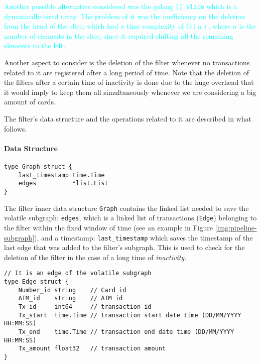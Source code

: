 \textcolor{cyan}{Another possible alternative considered was the golang \texttt{[] slice} which is a dynamically-sized array. The problem of it was the inefficiency on the deletion from the head of the slice, which had a time complexity of 
$O(n)$, where $n$ is the number of elements in the slice, since it required shifting all the remaining elements to the left.}

Another aspect to consider is the deletion of the filter whenever no transactions related to it are registered after a long period of time. Note that the deletion of the filters after a certain time of inactivity is done due to the huge overhead that it would imply to keep them all simultaneously whenever we are considering a big amount of cards.

The filter's data structure and the operations related to it are described in what follows.

\paragraph{Data Structure}

\begin{center}
\lstset{style=golangStyle}
\begin{lstlisting}[caption={filter subgraph data structure}]
type Graph struct {
	last_timestamp time.Time
	edges          *list.List
}
\end{lstlisting}
\end{center}

The filter inner data structure \texttt{Graph} contains the linked list needed to save the volatile subgraph: \texttt{edges}, which is a linked list of transactions (\texttt{Edge}) belonging to the filter within the fixed window of time (see an example in Figure \ref{img:pipeline-subgraph}), and a timestamp: \texttt{last\_timestamp} which saves the timestamp of the last edge that was added to the filter's subgraph. This is used to check for the deletion of the filter in the case of a long time of \textit{inactivity}.

\begin{center}
\lstset{style=golangStyle}
\begin{lstlisting}[caption={Edge of the volatile subgraph, a transaction belonging to the filter}]
// It is an edge of the volatile subgraph
type Edge struct {
	Number_id string    // Card id
	ATM_id    string    // ATM id
	Tx_id     int64     // transaction id
	Tx_start  time.Time // transaction start date time (DD/MM/YYYY HH:MM:SS)
	Tx_end    time.Time // transaction end date time (DD/MM/YYYY HH:MM:SS)
	Tx_amount float32   // transaction amount
}
\end{lstlisting}
\end{center}

